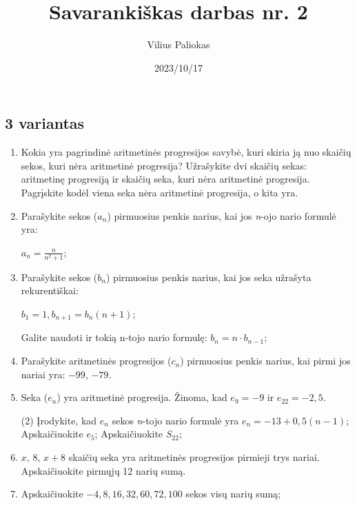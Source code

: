 \documentclass[a4paper]{article}
\title{Savarankiškas darbas nr. 2}
\author{Vilius Paliokas}
\date{2023/10/17}
\begin{document}
\thispagestyle{fancy}

\subsection*{3 variantas}

\begin{enumerate}
      \item Kokia yra pagrindinė aritmetinės progresijos savybė, kuri skiria ją
            nuo skaičių sekos, kuri nėra aritmetinė progresija? Užrašykite dvi
            skaičių sekas: aritmetinę progresiją ir skaičių seka, kuri nėra
            aritmetinė progresija. Pagrįskite kodėl viena seka nėra
            aritmetinė progresija, o kita yra.

      \item Parašykite sekos ($a_{n}$) pirmuosius penkis
            narius, kai jos \textit{n}-ojo nario formulė yra:

            $a_{n}=\frac{n}{n^{2} + 1}$;

      \item Parašykite sekos ($b_{n}$) pirmuosius penkis
            narius, kai jos seka užrašyta rekurentiškai:

            $b_1 = 1, b_{n+1}=b_{n}(n+1)$;

            Galite naudoti ir tokią n-tojo nario formulę: $b_{n}=n \cdot
                  b_{n-1}$;

      \item Parašykite aritmetinės progresijos ($c_{n}$) pirmuosius penkis
            narius, kai pirmi jos nariai yra: $-99$, $-79$.

      \item Seka ($e_{n}$) yra aritmetinė progresija. Žinoma, kad $e_{9}=-9$ ir
            $e_{22}=-2,5$.

            \begin{tasks}[item-format={\normalfont}, after-item-skip=2mm](2)
                  \task* Įrodykite, kad $e_{n}$ sekos \textit{n}-tojo nario
                  formulė yra $e_{n}=-13+0,5(n-1)$;
                  \task Apskaičiuokite $e_{5}$;
                  \task Apskaičiuokite $S_{22}$;
            \end{tasks}

      \item $ x $, $ 8 $, $ x + 8$ skaičių seka yra aritmetinės progresijos
            pirmieji trys nariai. Apskaičiuokite pirmųjų 12 narių sumą.

      \item Apskaičiuokite $ -4, 8, 16, 32, 60, 72, 100 $ sekos visų narių sumą;


\end{enumerate}
\end{document}
